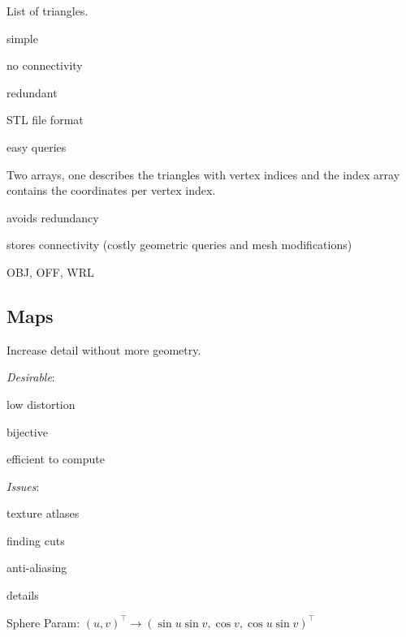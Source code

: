 \begin{definition}
  List of triangles.
  \begin{itemize*}
    \item simple
    \item no connectivity
    \item redundant
    \item STL file format
    \item easy queries
  \end{itemize*}
\end{definition}

\begin{definition}
  Two arrays, one describes the triangles with vertex indices and the index array contains the coordinates per vertex index.
  \begin{itemize*}
    \item avoids redundancy
    \item stores connectivity (costly geometric queries and mesh modifications)
    \item OBJ, OFF, WRL
  \end{itemize*}
\end{definition}

\subsection{Maps}

\begin{definition}
  Increase detail without more geometry.

  \textit{Desirable}:
  \begin{itemize*}
    \item low distortion
    \item bijective
    \item efficient to compute
  \end{itemize*}

  \textit{Issues}:
  \begin{itemize*}
    \item texture atlases
    \item finding cuts
    \item anti-aliasing
    \item details
  \end{itemize*}
\end{definition}

\begin{theorem}
  Sphere Param:
  \((u, v)^\top \to (\sin u \sin v, \cos v, \cos u \sin v)^\top\)
\end{theorem}

